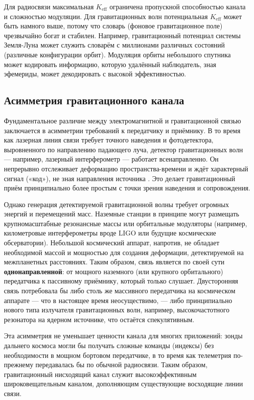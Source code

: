 \documentclass[12pt,a4paper]{article}
\newcommand{\Keff}{K_{\mathrm{eff}}}
\begin{document}
	Для радиосвязи максимальная \(\Keff\) ограничена пропускной способностью канала и сложностью модуляции. Для гравитационных волн потенциальная \(\Keff\) может быть намного выше, потому что словарь (фоновое гравитационное поле) чрезвычайно богат и стабилен. Например, гравитационный потенциал системы Земля-Луна может служить словарём с миллионами различных состояний (различные конфигурации орбит). Модуляция орбиты небольшого спутника может кодировать информацию, которую удалённый наблюдатель, зная эфемериды, может декодировать с высокой эффективностью.
	
	\subsection{Асимметрия гравитационного канала}
	\label{subsec:asymmetry}
	
	Фундаментальное различие между электромагнитной и гравитационной связью заключается в асимметрии требований к передатчику и приёмнику. В то время как лазерная линия связи требует точного наведения и фотодетектора, выровненного по направлению падающего луча, детектор гравитационных волн — например, лазерный интерферометр — работает всенаправленно. Он непрерывно отслеживает деформацию пространства-времени и ждёт характерный сигнал («код»), не зная направления источника \cite{LIGO}. Это делает гравитационный приём принципиально более простым с точки зрения наведения и сопровождения.
	
	Однако генерация детектируемой гравитационной волны требует огромных энергий и перемещений масс. Наземные станции в принципе могут размещать крупномасштабные резонансные массы или орбитальные модуляторы (например, километровые интерферометры вроде LIGO или будущие космические обсерватории). Небольшой космический аппарат, напротив, не обладает необходимой массой и мощностью для создания деформации, детектируемой на межпланетных расстояниях. Таким образом, связь является по своей сути \textbf{однонаправленной}: от мощного наземного (или крупного орбитального) передатчика к пассивному приёмнику, который только слушает. Двусторонняя связь потребовала бы либо столь же массивного передатчика на космическом аппарате — что в настоящее время неосуществимо, — либо принципиально нового типа излучателя гравитационных волн, например, высокочастотного резонатора на ядерном источнике, что остаётся спекулятивным.
	
	Эта асимметрия не уменьшает ценности канала для многих приложений: зонды дальнего космоса могли бы получать сложные команды (индексы) без необходимости в мощном бортовом передатчике, в то время как телеметрия по-прежнему передавалась бы по обычной радиосвязи. Таким образом, гравитационный нисходящий канал служит высокоэффективным широковещательным каналом, дополняющим существующие восходящие линии связи.
	
\end{document}
